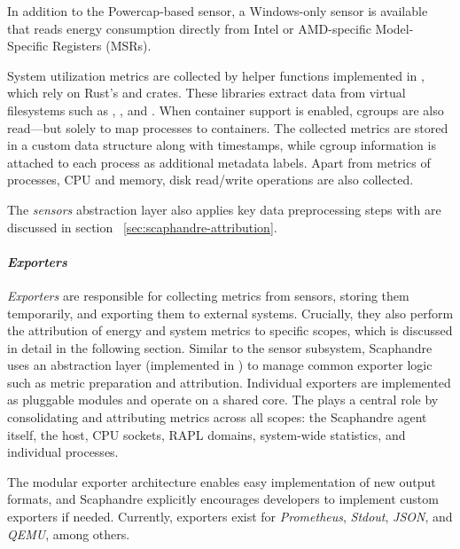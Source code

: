 In addition to the Powercap-based sensor, a Windows-only sensor is available that reads energy consumption directly from Intel or AMD-specific Model-Specific Registers (MSRs).

System utilization metrics are collected by helper functions implemented in , which rely on Rust’s  and  crates. These libraries extract data from virtual filesystems such as , , and . When container support is enabled, cgroups are also read—but solely to map processes to containers. The collected metrics are stored in a custom data structure along with timestamps, while cgroup information is attached to each process as additional metadata labels. Apart from metrics of processes, CPU and memory, disk read/write operations are also collected.

The \textit{sensors} abstraction layer also applies key data preprocessing steps with are discussed in section ~\ref{sec:scaphandre-attribution}.

\paragraph{\textit{Exporters}}
\textit{Exporters} are responsible for collecting metrics from sensors, storing them temporarily, and exporting them to external systems. Crucially, they also perform the attribution of energy and system metrics to specific scopes, which is discussed in detail in the following section. Similar to the sensor subsystem, Scaphandre uses an abstraction layer (implemented in ) to manage common exporter logic such as metric preparation and attribution. Individual exporters are implemented as pluggable modules and operate on a shared core. The  plays a central role by consolidating and attributing metrics across all scopes: the Scaphandre agent itself, the host, CPU sockets, RAPL domains, system-wide statistics, and individual processes.

The modular exporter architecture enables easy implementation of new output formats, and Scaphandre explicitly encourages developers to implement custom exporters if needed. Currently, exporters exist for \textit{Prometheus}, \textit{Stdout}, \textit{JSON}, and \textit{QEMU}, among others.

